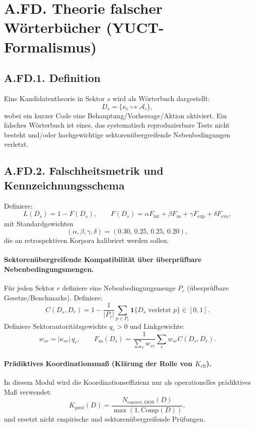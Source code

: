 \documentclass[13pt,a4paper]{article}
\newcommand{\Kpred}{K_{\mathrm{pred}}}
\newcommand{\abs}[1]{\left|#1\right|}
\newcommand{\indicator}{\mathbf{1}}
\begin{document}
	\section*{A.FD. Theorie falscher Wörterbücher (YUCT-Formalismus)}
	
	\subsection*{A.FD.1. Definition}
	Eine Kandidatentheorie in Sektor $s$ wird als Wörterbuch dargestellt:
	\[ D_s=\{\kappa_i\mapsto \mathcal{A}_i\}, \]
	wobei ein kurzer Code eine Behauptung/Vorhersage/Aktion aktiviert. Ein falsches Wörterbuch ist eines, das systematisch reproduzierbare Tests nicht besteht und/oder hochgewichtige sektorenübergreifende Nebenbedingungen verletzt.
	
	\subsection*{A.FD.2. Falschheitsmetrik und Kennzeichnungsschema}
	Definiere:
	\[ L(D_s)=1-F(D_s),\qquad
	F(D_s)=\alpha F_{\mathrm{int}}+\beta F_{\mathrm{xs}}+\gamma F_{\mathrm{exp}}+\delta F_{\mathrm{evo}}, \]
	mit Standardgewichten
	\[ (\alpha,\beta,\gamma,\delta)=(0.30,\,0.25,\,0.25,\,0.20), \]
	die an retrospektiven Korpora kalibriert werden sollen.
	
	\paragraph{Sektorenübergreifende Kompatibilität über überprüfbare Nebenbedingungsmengen.}
	Für jeden Sektor $r$ definiere eine Nebenbedingungsmenge $P_r$ (überprüfbare Gesetze/Benchmarks). Definiere:
	\[ C(D_s,D_r)=1-\frac{1}{|P_r|}\sum_{p\in P_r}\indicator\{D_s\text{ verletzt }p\}\in[0,1]. \]
	Definiere Sektorautoritätsgewichte $q_r>0$ und Linkgewichte:
	\[ w_{sr}=\abs{\kappa_{sr}}\,q_r,\qquad
	F_{\mathrm{xs}}(D_s)=\frac{1}{\sum_r w_{sr}}\sum_{r}w_{sr}C(D_s,D_r). \]
	
	\paragraph{Prädiktives Koordinationsmaß (Klärung der Rolle von $K_{\mathrm{eff}}$).}
	In diesem Modul wird die Koordinationseffizienz nur als operationelles prädiktives Maß verwendet:
	\[ \Kpred(D)=\frac{N_{\mathrm{correct,OOS}}(D)}{\max(1,\mathrm{Comp}(D))}, \]
	und ersetzt nicht empirische und sektorenübergreifende Prüfungen.
	
\end{document}
